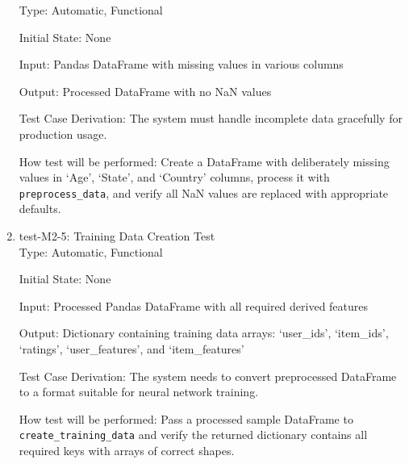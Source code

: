 \documentclass[12pt, titlepage]{article}
\begin{document}
\begin{enumerate}
  Type: Automatic, Functional

  Initial State: None

  Input: Pandas DataFrame with missing values in various columns

  Output: Processed DataFrame with no NaN values

  Test Case Derivation: The system must handle incomplete data gracefully for production usage.

  How test will be performed: Create a DataFrame with deliberately missing values in `Age', `State', and `Country' columns, process it with \texttt{preprocess\_data}, and verify all NaN values are replaced with appropriate defaults.
  \item{test-M2-5: Training Data Creation Test\\}
  Type: Automatic, Functional

  Initial State: None

  Input: Processed Pandas DataFrame with all required derived features

  Output: Dictionary containing training data arrays: `user\_ids', `item\_ids', `ratings', `user\_features', and `item\_features'

  Test Case Derivation: The system needs to convert preprocessed DataFrame to a format suitable for neural network training.

  How test will be performed: Pass a processed sample DataFrame to \texttt{create\_training\_data} and verify the returned dictionary contains all required keys with arrays of correct shapes.
\end{enumerate}
\end{document}
